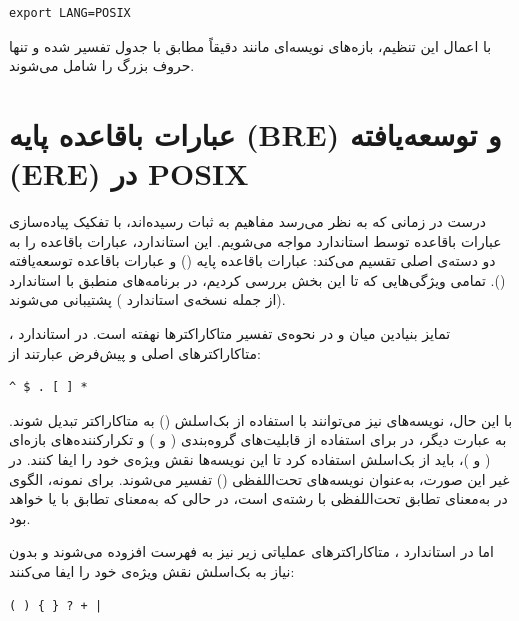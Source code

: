 \begin{latin}
\begin{lstlisting}
export LANG=POSIX
\end{lstlisting}
\end{latin}

با اعمال این تنظیم، بازه‌های نویسه‌ای مانند \cmd{[A-Z]} دقیقاً مطابق با جدول  تفسیر شده و تنها حروف بزرگ را شامل می‌شوند.

\section{عبارات باقاعده پایه (BRE) و توسعه‌یافته (ERE) در POSIX}

درست در زمانی که به نظر می‌رسد مفاهیم به ثبات رسیده‌اند، با تفکیک پیاده‌سازی عبارات باقاعده توسط استاندارد  مواجه می‌شویم. این استاندارد، عبارات باقاعده را به دو دسته‌ی اصلی تقسیم می‌کند: عبارات باقاعده پایه () و عبارات باقاعده توسعه‌یافته (). تمامی ویژگی‌هایی که تا این بخش بررسی کردیم، در برنامه‌های منطبق با استاندارد  (از جمله نسخه‌ی استاندارد ) پشتیبانی می‌شوند.

تمایز بنیادین میان  و  در نحوه‌ی تفسیر متاکاراکترها نهفته است. در استاندارد ، متاکاراکترهای اصلی و پیش‌فرض عبارتند از:

\begin{latin}
\begin{lstlisting}
^ $ . [ ] *
\end{lstlisting}
\end{latin}

با این حال، نویسه‌های  نیز می‌توانند با استفاده از بک‌اسلش (\cmd{\textbackslash}) به متاکاراکتر تبدیل شوند. به عبارت دیگر، در  برای استفاده از قابلیت‌های گروه‌بندی (\cmd{\textbackslash(} و \cmd{\textbackslash)}) و تکرارکننده‌های بازه‌ای (\cmd{\textbackslash\{} و \cmd{\textbackslash\}})، باید از بک‌اسلش استفاده کرد تا این نویسه‌ها نقش ویژه‌ی خود را ایفا کنند. در غیر این صورت، به‌عنوان نویسه‌های تحت‌اللفظی () تفسیر می‌شوند. برای نمونه، الگوی  در  به‌معنای تطابق تحت‌اللفظی با رشته‌ی  است، در حالی که  به‌معنای تطابق با  یا  خواهد بود.

اما در استاندارد ، متاکاراکترهای عملیاتی زیر نیز به فهرست افزوده می‌شوند و بدون نیاز به بک‌اسلش نقش ویژه‌ی خود را ایفا می‌کنند:

\begin{latin}
\begin{lstlisting}
( ) { } ? + |
\end{lstlisting}
\end{latin}

